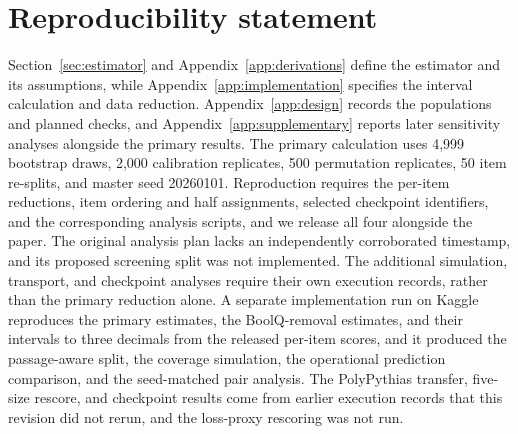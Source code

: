 \documentclass{article}
\begin{document}
\section*{Reproducibility statement}
Section~\ref{sec:estimator} and Appendix~\ref{app:derivations} define the estimator and its assumptions, while Appendix~\ref{app:implementation} specifies the interval calculation and data reduction. Appendix~\ref{app:design} records the populations and planned checks, and Appendix~\ref{app:supplementary} reports later sensitivity analyses alongside the primary results. The primary calculation uses 4,999 bootstrap draws, 2,000 calibration replicates, 500 permutation replicates, 50 item re-splits, and master seed 20260101. Reproduction requires the per-item reductions, item ordering and half assignments, selected checkpoint identifiers, and the corresponding analysis scripts, and we release all four alongside the paper. The original analysis plan lacks an independently corroborated timestamp, and its proposed screening split was not implemented. The additional simulation, transport, and checkpoint analyses require their own execution records, rather than the primary reduction alone. A separate implementation run on Kaggle reproduces the primary estimates, the BoolQ-removal estimates, and their intervals to three decimals from the released per-item scores, and it produced the passage-aware split, the coverage simulation, the operational prediction comparison, and the seed-matched pair analysis. The PolyPythias transfer, five-size rescore, and checkpoint results come from earlier execution records that this revision did not rerun, and the loss-proxy rescoring was not run.


\clearpage
\appendix


\end{document}
